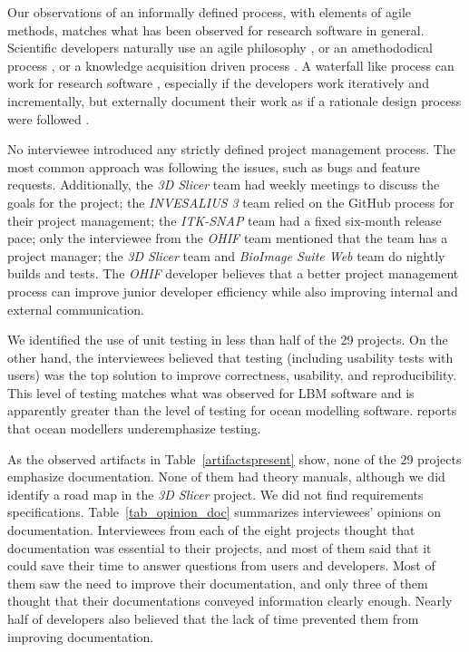 \documentclass[final, 3p, times, authoryear]{elsarticle}
\begin{document}
Our observations of an informally defined process, with elements of agile
methods, matches what has been observed for research software in general.
Scientific developers naturally use an agile philosophy \citep{AckroydEtAl2008,
CarverEtAl2007, EasterbrookAndJohns2009, Segal2005, HeatonAndCarver2015}, or an
amethododical process \citep{Kelly2013}, or a knowledge acquisition driven
process \citep{Kelly2015}.  A waterfall like process can work for research
software \citep{Smith2016}, especially if the developers work iteratively and
incrementally, but externally document their work as if a rationale design
process were followed \citep{parnas1986rational}.

No interviewee introduced any strictly defined project management process. The
most common approach was following the issues, such as bugs and feature
requests. Additionally, the \textit{3D Slicer} team had weekly meetings to
discuss the goals for the project; the \textit{INVESALIUS 3} team relied on the
GitHub process for their project management; the \textit{ITK-SNAP} team had a
fixed six-month release pace; only the interviewee from the \textit{OHIF} team
mentioned that the team has a project manager; the \textit{3D Slicer} team and
\textit{BioImage Suite Web} team do nightly builds and tests. The \textit{OHIF}
developer believes that a better project management process can improve junior
developer efficiency while also improving internal and external communication.

We identified the use of unit testing in less than half of the 29 projects. On
the other hand, the interviewees believed that testing (including usability
tests with users) was the top solution to improve correctness, usability, and
reproducibility.  This level of testing matches what was observed for LBM
software \citep{Michalski2021} and is apparently greater than the level of
testing for ocean modelling software.  \citet{JungEtAl2022} reports that ocean
modellers underemphasize testing.

As the observed artifacts in Table~\ref{artifactspresent} show, none of the 29
projects emphasize documentation. None of them had theory manuals, although we
did identify a road map in the \textit{3D Slicer} project.  We did not find
requirements specifications. Table~\ref{tab_opinion_doc} summarizes
interviewees' opinions on documentation. Interviewees from each of the eight
projects thought that documentation was essential to their projects, and most of
them said that it could save their time to answer questions from users and
developers. Most of them saw the need to improve their documentation, and only
three of them thought that their documentations conveyed information clearly
enough. Nearly half of developers also believed that the lack of time prevented
them from improving documentation.
\end{document}
